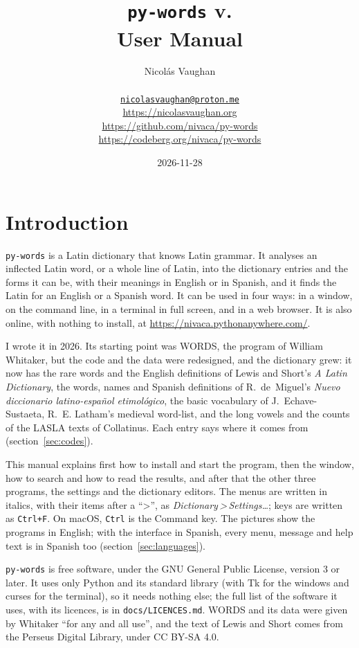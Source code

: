 \documentclass[12pt,
              article,
              oneside
              ]{memoir}
\title{\bfseries%
  \texttt{py-words} v.\version{} \\
  User Manual}
\author{%
  Nicolás Vaughan\\
  \begin{minipage}[t]{0.8\linewidth}
    \centering\small%
    \href{mailto:nicolasvaughan@proton.me}{\texttt{nicolasvaughan@proton.me}}\\
    \url{https://nicolasvaughan.org}\\
    \url{https://github.com/nivaca/py-words}\\
    \url{https://codeberg.org/nivaca/py-words}\\
  \end{minipage}}
\date{2026-11-28}
\newcommand*{\menu}[1]{\textit{#1}}
\newcommand*{\then}{\,>\,}
\newcommand*{\key}[1]{\texttt{#1}}
\begin{document}
\maketitle

\tableofcontents*

\section{Introduction}
\noindent
\texttt{py-words} is a Latin dictionary that knows Latin grammar. It
analyses an inflected Latin word, or a whole line of Latin, into the
dictionary entries and the forms it can be, with their meanings in English
or in Spanish, and it finds the Latin for an English or a Spanish word. It
can be used in four ways: in a window, on the command line, in a terminal in
full screen, and in a web browser. It is also online, with nothing to
install, at \url{https://nivaca.pythonanywhere.com/}.

%
I wrote it in 2026. Its starting point was WORDS, the program of William
Whitaker, but the code and the data were redesigned, and the dictionary
grew: it now has the rare words and the English definitions of Lewis and
Short's \textit{A Latin Dictionary}, the words, names and Spanish
definitions of R.~de~Miguel's \textit{Nuevo diccionario latino-español
etimológico}, the basic vocabulary of J.~Echave-Sustaeta, R.~E. Latham's
medieval word-list, and the long vowels and the counts of the LASLA texts
of Collatinus. Each entry says
where it comes from (section~\ref{sec:codes}).

%
This manual explains first how to install and start the program, then the
window, how to search and how to read the results, and after that the
other three programs, the settings and the dictionary editors. The menus
are written in italics, with their items after a \enquote{>}, as
\menu{Dictionary\then Settings\ldots}; keys are written as \key{Ctrl+F}.
On macOS, \key{Ctrl} is the Command key. The pictures show the programs in
English; with the interface in Spanish, every menu, message and help text
is in Spanish too (section~\ref{sec:languages}).

%
\texttt{py-words} is free software, under the GNU General Public License,
version 3 or later. It uses only Python and its standard library (with Tk
for the windows and curses for the terminal), so it needs nothing else; the
full list of the software it uses, with its licences, is in
\texttt{docs/LICENCES.md}. WORDS and its data were given by Whitaker
\enquote{for any and all use}, and the text of Lewis and Short comes from
the Perseus Digital Library, under CC BY-SA 4.0.
\end{document}
